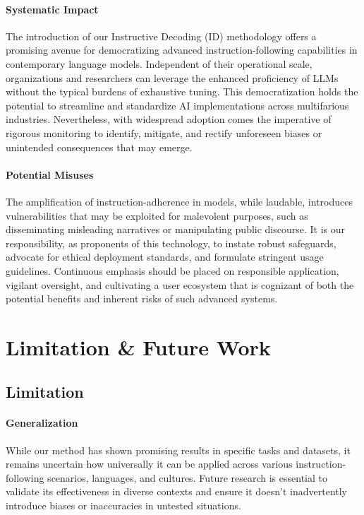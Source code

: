 \paragraph{Systematic Impact}
The introduction of our Instructive Decoding (ID) methodology offers a promising avenue for democratizing advanced instruction-following capabilities in contemporary language models. Independent of their operational scale, organizations and researchers can leverage the enhanced proficiency of LLMs without the typical burdens of exhaustive tuning. This democratization holds the potential to streamline and standardize AI implementations across multifarious industries. Nevertheless, with widespread adoption comes the imperative of rigorous monitoring to identify, mitigate, and rectify unforeseen biases or unintended consequences that may emerge.



\paragraph{Potential Misuses}
The amplification of instruction-adherence in models, while laudable, introduces vulnerabilities that may be exploited for malevolent purposes, such as disseminating misleading narratives or manipulating public discourse. It is our responsibility, as proponents of this technology, to instate robust safeguards, advocate for ethical deployment standards, and formulate stringent usage guidelines. Continuous emphasis should be placed on responsible application, vigilant oversight, and cultivating a user ecosystem that is cognizant of both the potential benefits and inherent risks of such advanced systems.





\section{Limitation \& Future Work}
\subsection{Limitation}
\paragraph{Generalization}
While our method has shown promising results in specific tasks and datasets, it remains uncertain how universally it can be applied across various instruction-following scenarios, languages, and cultures. Future research is essential to validate its effectiveness in diverse contexts and ensure it doesn't inadvertently introduce biases or inaccuracies in untested situations.


